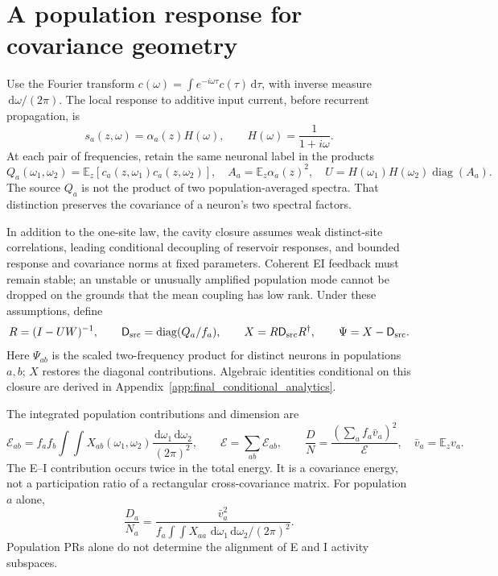 \documentclass[11pt]{article}
\newcommand{\E}{\mathbb E}
\newcommand{\dd}{\,\mathrm d}
\newcommand{\diag}{\operatorname{diag}}
\newcommand{\PR}{D}
\newcommand{\energy}{\mathcal E}
\begin{document}
\section{A population response for covariance geometry}

Use the Fourier transform $c(\omega)=\int e^{-i\omega\tau}c(\tau)\dd\tau$,
with inverse measure $\dd\omega/(2\pi)$. The local response to additive
input current, before recurrent propagation, is
\begin{equation}
 s_a(z,\omega)=\alpha_a(z)H(\omega),\qquad
 H(\omega)=\frac{1}{1+i\omega}.
 \label{eq:response}
\end{equation}
At each pair of frequencies, retain the same neuronal label in the products
\begin{equation}
 Q_a(\omega_1,\omega_2)=\E_z[c_a(z,\omega_1)c_a(z,\omega_2)],\quad
 A_a=\E_z\alpha_a(z)^2,\quad
 U=H(\omega_1)H(\omega_2)\diag(A_a).
 \label{eq:source}
\end{equation}
The source $Q_a$ is not the product of two population-averaged spectra.
That distinction preserves the covariance of a neuron's two spectral factors.

In addition to the one-site law, the cavity closure assumes weak distinct-site
correlations, leading conditional decoupling of reservoir responses, and
bounded response and covariance norms at fixed parameters. Coherent EI
feedback must remain stable; an unstable or unusually amplified population
mode cannot be dropped on the grounds that the mean coupling has low rank.
Under these assumptions, define
\begin{equation}
 R=(I-UW)^{-1},\qquad \mathsf D_{\rm src}=\diag(Q_a/f_a),\qquad
 X=R\mathsf D_{\rm src}R^\dagger,\qquad \Psi=X-\mathsf D_{\rm src}.
 \label{eq:resolvent}
\end{equation}
Here $\Psi_{ab}$ is the scaled two-frequency product for distinct neurons
in populations $a,b$; $X$ restores the diagonal contributions. Algebraic
identities conditional on this closure are derived in Appendix~\ref{app:final_conditional_analytics}.

The integrated population contributions and dimension are
\begin{equation}
 \energy_{ab}=f_af_b\int\!\!\int X_{ab}(\omega_1,\omega_2)
                        \frac{\dd\omega_1\dd\omega_2}{(2\pi)^2},\qquad
 \energy=\sum_{ab}\energy_{ab},\qquad
 \boxed{\frac{\PR}{N}=\frac{(\sum_af_a\bar v_a)^2}{\energy}},
 \quad \bar v_a=\E_zv_a.
 \label{eq:geometry}
\end{equation}
The E--I contribution occurs twice in the total energy. It is a covariance
energy, not a participation ratio of a rectangular cross-covariance matrix.
For population $a$ alone,
\begin{equation}
 \frac{D_a}{N_a}=\frac{\bar v_a^2}
 {f_a\int\!\!\int X_{aa}\,\dd\omega_1\dd\omega_2/(2\pi)^2}.
 \label{eq:populationpr}
\end{equation}
Population PRs alone do not determine the alignment of E and I activity
subspaces.
\end{document}

